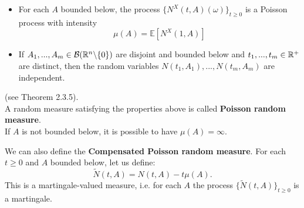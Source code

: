 \begin{itemize}
 \item For each $A$ bounded below, the process $\bigl \{ N^X(t,A)(\omega) \bigr \}_{t\geq 0}$ is a Poisson process with intensity 
 \begin{equation}
 \mu(A) = \mathbb{E}[N^X(1,A) ] 
 \end{equation}
 \item If $A_1, ..., A_m \in \mathcal{B}(\mathbb{R}^n \backslash \{ 0 \})$ are disjoint and bounded below and $t_1, ..., t_m \in \mathbb{R}^+$ are distinct, then
 the random variables $N(t_1,A_1), ..., N(t_m,A_m)$ are independent.
\end{itemize}
(see \cite{Applebaum} Theorem 2.3.5). \\
A random measure satisfying the properties above is called \textbf{Poisson random measure}.\\
If $A$ is not bounded below, it is possible to have $\mu(A) = \infty$. 

We can also define the \textbf{Compensated Poisson random measure}. For each $t \geq 0$ and $A$ bounded below, let us define: 
\begin{equation}
 \tilde{N}(t,A) = N(t,A) - t\mu(A). 
\end{equation}
This is a martingale-valued measure, i.e. for each $A$ the process $\bigl \{ \tilde{N}(t,A) \bigr \}_{t\geq 0} $ is a martingale.  


